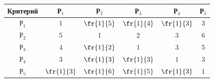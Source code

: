 \begin{table}
\begin{center}
\end{center}

\vspace*{-8.20552pt}



\begin{center}

\parbox{240pt}{



}

\vspace*{2ex}



\tabcolsep=12pt

\begin{tabular}{|c|c|c|c|c|c|}

\hline

Критерий&Р$_1$&Р$_2$&Р$_3$&Р$_4$&Р$_5$\\

\hline

Р$_1$&1&$\fr{1}{5}$&$\fr{1}{4}$&$\fr{1}{3}$&3\\

Р$_2$&5&1&2&3&6\\

Р$_3$&4&$\fr{1}{2}$&1&3&5\\

Р$_4$&3&$\fr{1}{3}$&$\fr{1}{3}$&1&3\\

Р$_5$&$\fr{1}{3}$&$\fr{1}{6}$&$\fr{1}{5}$&$\fr{1}{3}$&1\\

\hline

      \end{tabular}

      \end{center}

      \vspace*{-4pt}



 \begin{minipage}[b]{64mm}

            \begin{center}


\end{center}
\end{minipage}
\end{table}

